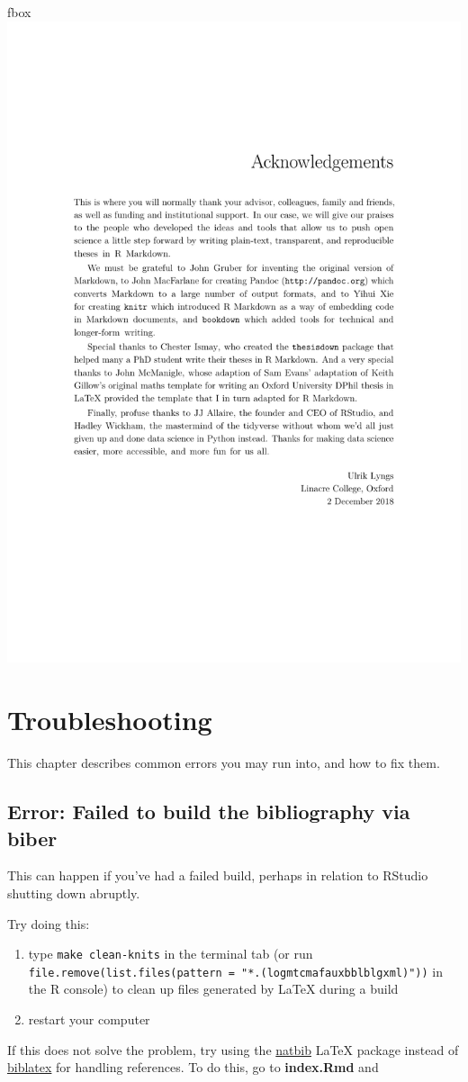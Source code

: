 \documentclass[a4paper, nobind]{templates/ociamthesis}
\providecommand{\tightlist}{%
  \setlength{\itemsep}{0pt}\setlength{\parskip}{0pt}}
\begin{document}
fbox{\includegraphics[width=0.32\linewidth]{figures/sample-content/alt_frontmatter_example/split/_000006.pdf}}

\hypertarget{troubleshooting}{%
\chapter{Troubleshooting}\label{troubleshooting}}

This chapter describes common errors you may run into, and how to fix them.

\hypertarget{error-failed-to-build-the-bibliography-via-biber}{%
\section{Error: Failed to build the bibliography via biber}\label{error-failed-to-build-the-bibliography-via-biber}}

This can happen if you've had a failed build, perhaps in relation to RStudio shutting down abruptly.

Try doing this:

\begin{enumerate}
\def\labelenumi{\arabic{enumi}.}
\tightlist
\item
  type \texttt{make\ clean-knits} in the terminal tab (or run \texttt{file.remove(list.files(pattern\ =\ "*.(log\textbar{}mtc\textbar{}maf\textbar{}aux\textbar{}bbl\textbar{}blg\textbar{}xml)"))} in the R console) to clean up files generated by LaTeX during a build
\item
  restart your computer
\end{enumerate}

If this does not solve the problem, try using the \href{https://www.overleaf.com/learn/latex/Bibliography_management_with_natbib}{natbib} LaTeX package instead of \href{https://www.overleaf.com/learn/latex/Articles/Getting_started_with_BibLaTeX}{biblatex} for handling references.
To do this, go to \textbf{index.Rmd} and
\end{document}
